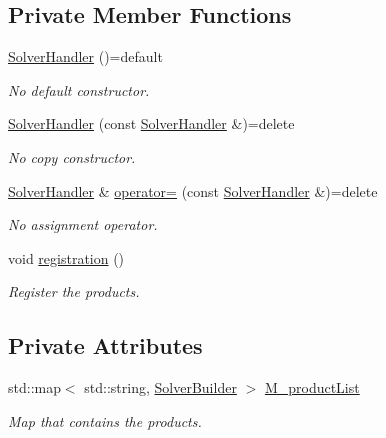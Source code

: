 \subsection*{Private Member Functions}
\begin{DoxyCompactItemize}
\item 
\hyperlink{classFVCode3D_1_1SolverHandler_a81166301e1e92747d301a88be5d46ac9}{Solver\+Handler} ()=default
\begin{DoxyCompactList}\small\item\em No default constructor. \end{DoxyCompactList}\item 
\hyperlink{classFVCode3D_1_1SolverHandler_a0a432b1448f44f045397672c56368797}{Solver\+Handler} (const \hyperlink{classFVCode3D_1_1SolverHandler}{Solver\+Handler} \&)=delete
\begin{DoxyCompactList}\small\item\em No copy constructor. \end{DoxyCompactList}\item 
\hyperlink{classFVCode3D_1_1SolverHandler}{Solver\+Handler} \& \hyperlink{classFVCode3D_1_1SolverHandler_aa5e2c4033e39eee7d5b120313258e683}{operator=} (const \hyperlink{classFVCode3D_1_1SolverHandler}{Solver\+Handler} \&)=delete
\begin{DoxyCompactList}\small\item\em No assignment operator. \end{DoxyCompactList}\item 
void \hyperlink{classFVCode3D_1_1SolverHandler_a4ad5c3dd8fa9a29281a802a1fa520f29}{registration} ()
\begin{DoxyCompactList}\small\item\em Register the products. \end{DoxyCompactList}\end{DoxyCompactItemize}
\subsection*{Private Attributes}
\begin{DoxyCompactItemize}
\item 
std\+::map$<$ std\+::string, \hyperlink{namespaceFVCode3D_ae1d65e23bd2373e382d1f397337de344}{Solver\+Builder} $>$ \hyperlink{classFVCode3D_1_1SolverHandler_a8c2ce305ada54d628a080f7f33d09140}{M\+\_\+product\+List}
\begin{DoxyCompactList}\small\item\em Map that contains the products. \end{DoxyCompactList}\end{DoxyCompactItemize}
